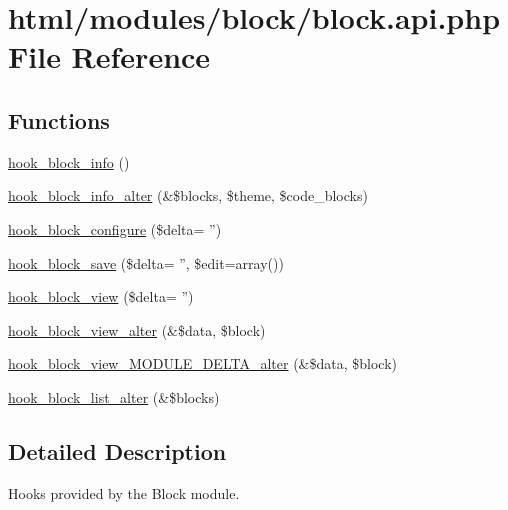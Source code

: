 \hypertarget{block_8api_8php}{
\section{html/modules/block/block.api.php File Reference}
\label{block_8api_8php}
}
\subsection*{Functions}
\begin{DoxyCompactItemize}
\item 
\hyperlink{group__hooks_ga2bd926c3e90deeba0c3ba64fb3c64d73}{hook\_\-block\_\-info} ()
\item 
\hyperlink{group__hooks_ga6a57bda0a2640ccadef4d7c8b6d2a26f}{hook\_\-block\_\-info\_\-alter} (\&\$blocks, \$theme, \$code\_\-blocks)
\item 
\hyperlink{group__hooks_gacc86fefd1e0299f387f79a37dd1a48b7}{hook\_\-block\_\-configure} (\$delta= '')
\item 
\hyperlink{group__hooks_ga622024ce4f818c241ca7a765e829f928}{hook\_\-block\_\-save} (\$delta= '', \$edit=array())
\item 
\hyperlink{group__hooks_gaa14092a3e74cdc57aa295100cfd6860d}{hook\_\-block\_\-view} (\$delta= '')
\item 
\hyperlink{group__hooks_ga65868e8e24bb04e5eb9e533c4d413b10}{hook\_\-block\_\-view\_\-alter} (\&\$data, \$block)
\item 
\hyperlink{group__hooks_ga8888fb6b153c6a93238eebf2be51eb18}{hook\_\-block\_\-view\_\-MODULE\_\-DELTA\_\-alter} (\&\$data, \$block)
\item 
\hyperlink{group__hooks_gaf38c7633b52b18831e3ec0459d8e9f41}{hook\_\-block\_\-list\_\-alter} (\&\$blocks)
\end{DoxyCompactItemize}


\subsection{Detailed Description}
Hooks provided by the Block module. 